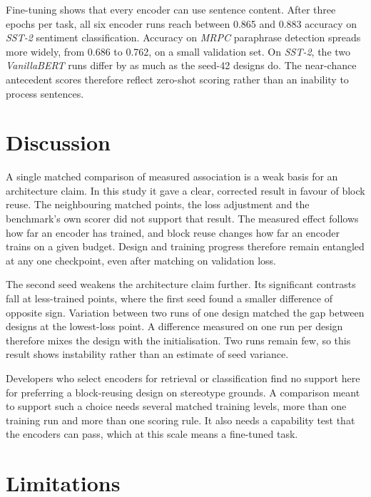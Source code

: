 \documentclass[sigconf,natbib=true]{acmart}
\begin{document}
Fine-tuning shows that every encoder can use sentence content. After three epochs
per task, all six encoder runs reach between 0.865 and 0.883 accuracy on
\emph{SST-2} sentiment classification. Accuracy on \emph{MRPC} paraphrase
detection spreads more widely, from 0.686 to 0.762, on a small validation set.
On \emph{SST-2}, the two \emph{VanillaBERT} runs differ by as much as the
seed-42 designs do. The near-chance antecedent scores therefore reflect
zero-shot scoring rather than an inability to process sentences.

\section{Discussion}
\label{sec:discussion}

A single matched comparison of measured association is a weak basis for an
architecture claim. In this study it gave a clear, corrected result in favour of
block reuse. The neighbouring matched points, the loss adjustment and the
benchmark's own scorer did not support that result. The measured effect follows
how far an encoder has trained, and block reuse changes how far an encoder
trains on a given budget. Design and training progress therefore remain
entangled at any one checkpoint, even after matching on validation loss.

The second seed weakens the architecture claim further. Its significant contrasts
fall at less-trained points, where the first seed found a smaller difference of
opposite sign. Variation between two runs of one design matched the gap between
designs at the lowest-loss point. A difference measured on one run per design
therefore mixes the design with the initialisation. Two runs remain few, so this
result shows instability rather than an estimate of seed variance.

Developers who select encoders for retrieval or classification find no support
here for preferring a block-reusing design on stereotype grounds. A comparison
meant to support such a choice needs several matched training levels, more than
one training run and more than one scoring rule. It also needs a capability test
that the encoders can pass, which at this scale means a fine-tuned task.

\section{Limitations}
\label{sec:limits}
\end{document}
